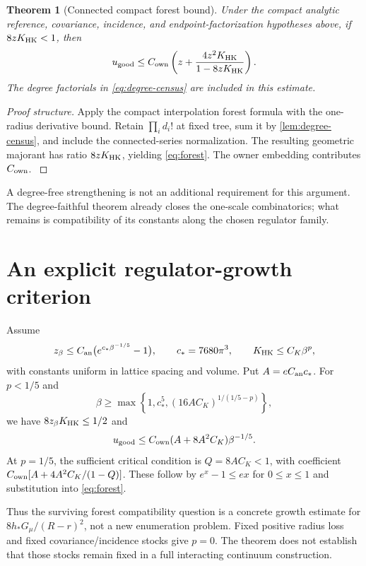 \documentclass[11pt,oneside,openany]{book}
\newtheorem{theorem}{Theorem}[chapter]
\theoremstyle{definition}
\theoremstyle{remark}
\newcommand{\src}[2]{\cite[#2]{#1}}
\begin{document}
\begin{theorem}[Connected compact forest bound]\label{thm:forest}
Under the compact analytic reference, covariance, incidence, and endpoint-factorization hypotheses above, if $8zK_{\rm HK}<1$, then
\begin{equation}\label{eq:forest}
u_{\rm good}\le C_{\rm own}
\left(z+\frac{4z^2K_{\rm HK}}{1-8zK_{\rm HK}}\right).
\end{equation}
The degree factorials in \cref{eq:degree-census} are included in this estimate.
\end{theorem}
\begin{proof}[Proof structure]
Apply the compact interpolation forest formula with the one-radius derivative bound. Retain $\prod_i d_i!$ at fixed tree, sum it by \cref{lem:degree-census}, and include the connected-series normalization. The resulting geometric majorant has ratio $8zK_{\rm HK}$, yielding \cref{eq:forest}. The owner embedding contributes $C_{\rm own}$. \src{F9}{V1--V4}
\end{proof}

A degree-free strengthening is not an additional requirement for this argument. The degree-faithful theorem already closes the one-scale combinatorics; what remains is compatibility of its constants along the chosen regulator family. \src{F10}{V100}

\section{An explicit regulator-growth criterion}
Assume
\[
z_\beta\le C_{\rm an}\bigl(e^{c_*\beta^{-1/5}}-1\bigr),
\qquad c_*=7680\pi^3,
\qquad K_{\rm HK}\le C_K\beta^p,
\]
with constants uniform in lattice spacing and volume. Put $A=eC_{\rm an}c_*$. For $p<1/5$ and
\begin{equation}\label{eq:beta-threshold}
\beta\ge\max\left\{1,c_*^5,(16AC_K)^{1/(1/5-p)}\right\},
\end{equation}
we have $8z_\beta K_{\rm HK}\le1/2$ and
\begin{equation}\label{eq:forest-beta}
u_{\rm good}\le C_{\rm own}(A+8A^2C_K)\beta^{-1/5}.
\end{equation}
At $p=1/5$, the sufficient critical condition is $Q=8AC_K<1$, with coefficient $C_{\rm own}[A+4A^2C_K/(1-Q)]$. These follow by $e^x-1\le ex$ for $0\le x\le1$ and substitution into \cref{eq:forest}.

Thus the surviving forest compatibility question is a concrete growth estimate for $8h_*G_\mu/(R-r)^2$, not a new enumeration problem. Fixed positive radius loss and fixed covariance/incidence stocks give $p=0$. The theorem does not establish that those stocks remain fixed in a full interacting continuum construction. \src{F10}{V100}
\end{document}
